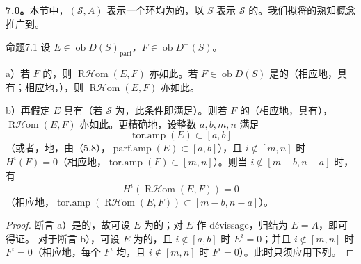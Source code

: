 \textbf{7.0。}本节中，$(\mathscr S,A)$ 表示一个环均为的，以 $S$ 表示 $\mathscr S$ 的。我们拟将的熟知概念推广到。

\begin{SGAresult}{命题}{7.1}
设 $E\in\operatorname{ob}D(S)_{\mathrm{parf}}$，$F\in\operatorname{ob}D^+(S)$。

a）若 $F$ 的，则 $\operatorname{R\mathcal Hom}(E,F)$ 亦如此。若 $F\in\operatorname{ob}D(S)$ 是的（相应地，具有；相应地，），则 $\operatorname{R\mathcal Hom}(E,F)$ 亦如此。

b）再假定 $E$ 具有（若 $\mathscr S$ 为，此条件即满足）。则若 $F$ 的（相应地，具有），$\operatorname{R\mathcal Hom}(E,F)$ 亦如此。更精确地，设整数 $a,b,m,n$ 满足
\[\operatorname{tor.amp}(E)\subset[a,b]\]
（或者，地，由（5.8），$\operatorname{parf.amp}(E)\subset[a,b]$），且 $i\notin[m,n]$ 时 $H^i(F)=0$（相应地，$\operatorname{tor.amp}(F)\subset[m,n]$）。则当 $i\notin[m-b,n-a]$ 时，有
\[H^i(\operatorname{R\mathcal Hom}(E,F))=0\]
（相应地，$\operatorname{tor.amp}(\operatorname{R\mathcal Hom}(E,F))\subset[m-b,n-a]$）。
\end{SGAresult}
\begin{proof}
断言 a）是的，故可设 $E$ 为的；对 $E$ 作 dévissage，归结为 $E=A$，即可得证。
对于断言 b），可设 $E$ 为的，且 $i\notin[a,b]$ 时 $E^i=0$；并且 $i\notin[m,n]$ 时 $F^i=0$（相应地，每个 $F^i$ 均，且 $i\notin[m,n]$ 时 $F^i=0$）。此时只须应用下列。
\end{proof}

